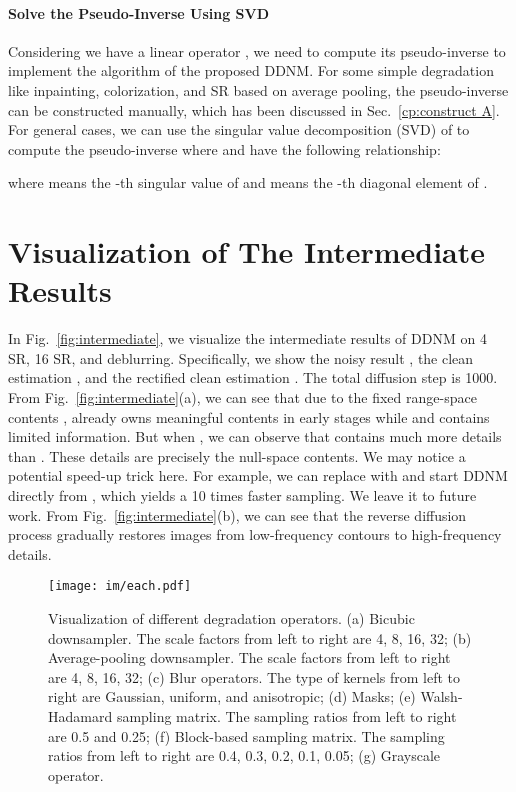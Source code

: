 \documentclass{article} \usepackage{iclr2023_conference,times}
\begin{document}
\paragraph{Solve the Pseudo-Inverse Using SVD} Considering we have a linear operator , we need to compute its pseudo-inverse  to implement the algorithm of 
the proposed DDNM. For some simple degradation like inpainting, colorization, and SR based on average pooling, the pseudo-inverse  can be constructed manually, which has been discussed in Sec.~\ref{cp:construct A}. For general cases, we can use the singular value decomposition (SVD) of  to compute the pseudo-inverse  where  and  have the following relationship:

where  means the -th singular value of  and  means the -th diagonal element of .


\section{Visualization of The Intermediate Results}
\label{ddnm visualization}
In Fig.~\ref{fig:intermediate}, we visualize the intermediate results of DDNM on 4 SR, 16 SR, and deblurring. Specifically, we show the noisy result , the clean estimation , and the rectified clean estimation . The total diffusion step is 1000. From Fig.~\ref{fig:intermediate}(a), we can see that due to the fixed range-space contents ,  already owns meaningful contents in early stages while  and  contains limited information. But when , we can observe that  contains much more details than . These details are precisely the null-space contents. We may notice a potential speed-up trick here. For example, we can replace  with  and start DDNM directly from , which yields a 10 times faster sampling. We leave it to future work. From Fig.~\ref{fig:intermediate}(b), we can see that the reverse diffusion process gradually restores images from low-frequency contours to high-frequency details.

\newpage


\begin{figure*}[ht]
  \centering
   \vspace{-0.5cm}
  \texttt{[image: im/each.pdf]}
   \vspace{-0.5cm}
  \caption{Visualization of different degradation operators. (a) Bicubic downsampler. The scale factors from left to right are 4, 8, 16, 32; (b) Average-pooling downsampler. The scale factors from left to right are 4, 8, 16, 32; (c) Blur operators. The type of kernels from left to right are Gaussian, uniform, and anisotropic; (d) Masks; (e) Walsh-Hadamard sampling matrix. The sampling ratios from left to right are 0.5 and 0.25; (f) Block-based sampling matrix. The sampling ratios from left to right are 0.4, 0.3, 0.2, 0.1, 0.05; (g) Grayscale operator.}
\label{fig:all_degradation} 
\end{figure*}
\end{document}

